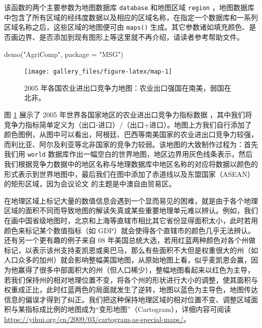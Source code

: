 \documentclass[
  b5paper,
  UTF8,twoside]{book}
\newenvironment{Shaded}{\begin{snugshade}}{\end{snugshade}}
\newcommand{\AttributeTok}[1]{\textcolor[rgb]{0.77,0.63,0.00}{#1}}
\newcommand{\FunctionTok}[1]{\textcolor[rgb]{0.00,0.00,0.00}{#1}}
\newcommand{\NormalTok}[1]{#1}
\newcommand{\StringTok}[1]{\textcolor[rgb]{0.31,0.60,0.02}{#1}}
\begin{document}
该函数的两个主要参数为地图数据库 \texttt{database} 和地图区域 \texttt{region} ，地图数据库中包含了所有区域的经纬度数据以及相应的区域名称，在指定一个数据库和一系列区域名称之后，这些区域的地图便可由 \texttt{maps()} 生成。其它参数诸如填充颜色、是否画边界、是否添加到现有图形上等这里就不再介绍，请读者参考帮助文件。





\begin{Shaded}
\begin{Highlighting}[]
\FunctionTok{demo}\NormalTok{(}\StringTok{"AgriComp"}\NormalTok{, }\AttributeTok{package =} \StringTok{"MSG"}\NormalTok{)}
\end{Highlighting}
\end{Shaded}

\begin{figure}

{\centering \texttt{[image: gallery\_files/figure-latex/map-1]} 

}

\caption[2005 年世界各国农业进出口竞争力地图]{2005 年各国农业进出口竞争力地图：农业出口强国在南美，弱国在北非。}\label{fig:map}
\end{figure}

图 \ref{fig:map}
展示了 2005 年世界各国家地区的农业进出口竞争力指标数据 \citep{Xie07}，其中我们将竞争力指标简单定义为（出口-进口）/（出口+进口）。地图上方我们自行添加了颜色图例，从图中可以看出，阿根廷、巴西等南美国家的农业进出口竞争力较强，而利比亚、阿尔及利亚等北非国家的竞争力较弱。该地图的大致制作过程为：首先我们用 \texttt{world} 数据库作出一幅空白的世界地图，地区边界用灰色线条表示，然后我们根据竞争力数据中的地区名称与地理数据库中地区名称的对应将数据以颜色的形式表示到世界地图中，最后我们在图中添加了赤道线以及东盟国家（ASEAN）的矩形区域，因为会议论文 \citet{Xie07} 的主题是中澳自由贸易区。

在地理区域上标记大量的数值信息会遇到一个显而易见的困难，就是由于各个地理区域的面积不同而导致地图的解读失真或某些重要地理单元难以辨认。例如，我们在画中国省级地图时，北京和上海等直辖市相比其它省份显得面积太小，此时若用颜色来标记某个数值指标（如 GDP）就会使得各个直辖市的颜色几乎无法辨认。还有另一个更有趣的例子来自 08 年美国总统大选，若用红蓝两种颜色对各个州做标记，以表示该州支持麦凯恩或奥巴马，那么有些面积不大但是权重很大的州（如人口众多的加州）就会影响整幅美国地图，从原始地图上看，似乎麦凯恩会赢，因为他赢得了很多中部面积大的州（但人口稀少），整幅地图看起来以红色为主导，若我们保持州的相对地理位置不变，将各个州的形状进行大小的调整，使其面积与权重成正比，此时红蓝两色的局面就发生了逆转，地图以蓝色为主导色，地图传达信息的偏误才得到了纠正。我们把这种保持地理区域的相对位置不变、调整区域面积与某指标成比例的地图成为``变形地图''（Cartogram），详细内容可阅读 \url{https://yihui.org/cn/2009/03/cartogram-as-special-maps/}。
\end{document}
